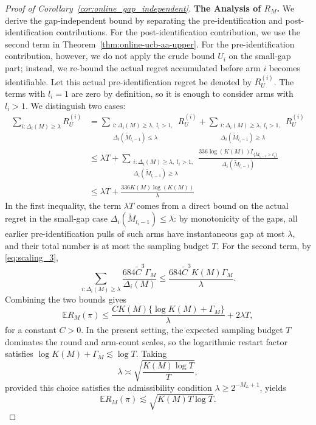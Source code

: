 \documentclass[11pt]{article}
\begin{document}
\begin{proof}[Proof of Corollary~\ref{cor:online_gap_independent}]

\textbf{The Analysis of $R_M$.} We derive the gap-independent bound by
separating the pre-identification and post-identification contributions. For the
post-identification contribution, we use the second term in
Theorem~\ref{thm:online-ucb-aa-upper}. For the pre-identification contribution,
however, we do not apply the crude bound \(U_i\) on the small-gap part; instead,
we re-bound the actual regret accumulated before arm \(i\) becomes identifiable.
Let this actual pre-identification regret be denoted by \(R_U^{(i)}\). The terms
with \(l_i=1\) are zero by definition, so it is enough to consider arms with
\(l_i>1\). We distinguish two cases:
	   \begin{align*}
	   \sum_{i:\Delta_i(M)\ge\lambda} R_{U}^{(i)} &= \sum_{\substack{i:\Delta_i(M)\ge\lambda,\; l_i>1,\\ \Delta_i(\tilde{M}_{l_i-1})\le\lambda}}  R_{U}^{(i)} + \sum_{\substack{i:\Delta_i(M)\ge\lambda,\; l_i>1,\\ \Delta_i(\tilde{M}_{l_i-1})\ge\lambda}}  R_{U}^{(i)}   \\
	   & \le \lambda T + \sum_{\substack{i:\Delta_i(M)\ge\lambda,\; l_i>1,\\ \Delta_i(\tilde{M}_{l_i-1})\ge\lambda}}  \frac{336 \log(K(M)) I_{ \{\tilde{M}_{l_i-1} >t_i\} } }{\Delta_i(\tilde{M}_{l_i-1})} \\
	   & \le \lambda T  + \frac{336 K(M) \log(K(M))}{\lambda}
	     \end{align*}
In the first inequality, the term \(\lambda T\) comes from a direct bound on
the actual regret in the small-gap case
\(\Delta_i(\tilde M_{l_i-1})\le\lambda\): by monotonicity of the gaps, all
earlier pre-identification pulls of such arms have instantaneous gap at most
\(\lambda\), and their total number is at most the sampling budget \(T\).
For the second term, by \eqref{eq:scaling_3},
\[
	\sum_{i:\Delta_i(M)\ge\lambda}
	\frac{684\tilde C^3\Gamma_M}{\Delta_i(M)}
	\le
	\frac{684\tilde C^3K(M)\Gamma_M}{\lambda}.
\]
Combining the two bounds gives
\[
\mathbb{E}R_M(\pi)
\le
\frac{C K(M)\{\log K(M)+\Gamma_M\}}{\lambda}
+2\lambda T ,
\]
for a constant \(C>0\). In the present setting, the expected sampling budget
\(T\) dominates the round and arm-count scales, so the logarithmic restart
factor satisfies \(\log K(M)+\Gamma_M\lesssim \log T\). Taking
\[
\lambda
\asymp
\sqrt{\frac{K(M)\log T}{T}},
\]
provided this choice satisfies the admissibility condition
\(\lambda\ge 2^{-M_L+1}\), yields
\[
\mathbb{E}R_M(\pi)
\lesssim
\sqrt{K(M)T\log T}.
\]



\end{proof}
\end{document}

